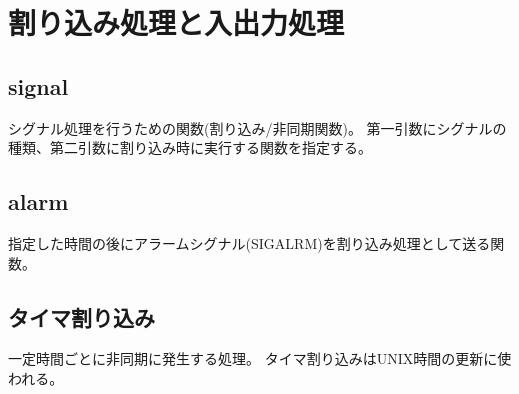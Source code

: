 \section{割り込み処理と入出力処理}
\subsection*{signal}
シグナル処理を行うための関数(割り込み/非同期関数)。
第一引数にシグナルの種類、第二引数に割り込み時に実行する関数を指定する。

\subsection*{alarm}
指定した時間の後にアラームシグナル(SIGALRM)を割り込み処理として送る関数。

\subsection*{タイマ割り込み}
一定時間ごとに非同期に発生する処理。
タイマ割り込みはUNIX時間の更新に使われる。